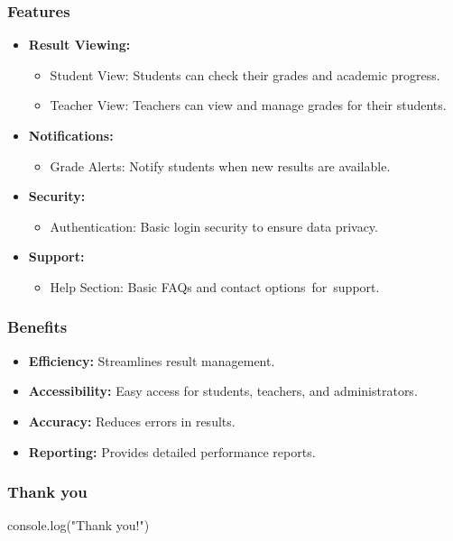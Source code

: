\documentclass{beamer}
\begin{document}
    \begin{frame}
        \frametitle{Features}
        
        \begin{itemize}
            \item \textbf{ Result Viewing:}
            \begin{itemize} 
              \item  Student View: Students can check their grades and academic progress.
              \item Teacher View: Teachers can view and manage grades for their students.
            \end{itemize} 
        \item \textbf{ Notifications:} 
          \begin{itemize} 
            \item  Grade Alerts: Notify students when new results are available.
          \end{itemize}   
        \item \textbf{ Security:}
          \begin{itemize} 
            \item  Authentication: Basic login security to ensure data privacy.
          \end{itemize}   
        \item  \textbf{Support:}
          \begin{itemize} 
            \item  Help Section: Basic FAQs and contact options for support.
          \end{itemize}  
       
    \end{itemize}
\end{frame}
\begin{frame}
    \frametitle{Benefits}
    \begin{itemize}
        \item \textbf{Efficiency:} Streamlines result management.
        \item \textbf{Accessibility:} Easy access for students, teachers, and administrators.
        \item \textbf{Accuracy:} Reduces errors in results.
        \item \textbf{Reporting:} Provides detailed performance reports.
    \end{itemize}
\end{frame}
\begin{frame}
    \frametitle{Thank you}
    console.log("Thank you!")
\end{frame}
\end{document}
